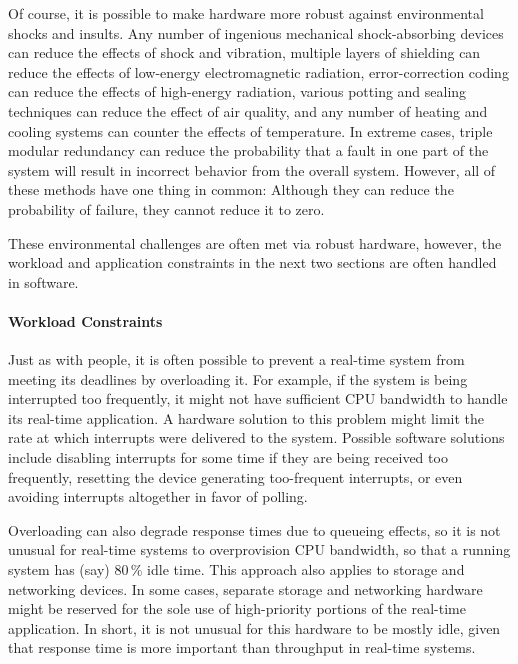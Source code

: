 Of course, it is possible to make hardware more robust against
environmental shocks and insults.
Any number of ingenious mechanical shock-absorbing devices can reduce the
effects of shock and vibration, multiple layers of shielding can reduce
the effects of low-energy electromagnetic radiation, error-correction
coding can reduce the effects of high-energy radiation, various potting
and sealing techniques can reduce the effect of air quality, and any
number of heating and cooling systems can counter the effects of temperature.
In extreme cases, triple modular redundancy can reduce the probability that
a fault in one part of the system will result in incorrect behavior from
the overall system.
However, all of these methods have one thing in common:  Although they
can reduce the probability of failure, they cannot reduce it to zero.

These environmental challenges are often met via robust hardware, however,
the workload and application constraints in the next two sections are
often handled in software.

\paragraph{Workload Constraints}
\label{sec:advsync:Workload Constraints}

Just as with people, it is often possible to prevent a real-time system
from meeting its deadlines by overloading it.
For example, if the system is being interrupted too frequently, it might
not have sufficient CPU bandwidth to handle its real-time application.
A hardware solution to this problem might limit the rate at which
interrupts were delivered to the system.
Possible software solutions include disabling interrupts for some time if
they are being received too frequently,
resetting the device generating too-frequent interrupts,
or even avoiding interrupts altogether in favor of polling.

Overloading can also degrade response times due to queueing effects,
so it is not unusual for real-time systems to overprovision CPU bandwidth,
so that a running system has (say) 80\,\% idle time.
This approach also applies to storage and networking devices.
In some cases, separate storage and networking hardware might be reserved
for the sole use of high-priority portions of the real-time application.
In short, it is not unusual for this hardware to be mostly idle, given
that response time is more important than throughput in
real-time systems.

